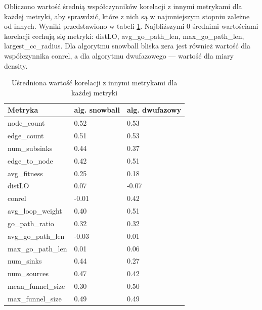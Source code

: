 Obliczono wartość średnią współczynników korelacji z innymi metrykami dla każdej metryki, aby sprawdzić, które z nich
są w najmniejszym stopniu zależne od innych. Wyniki przedstawiono w tabeli \ref{tab:meancorr}.
Najbliższymi 0 średnimi wartościami korelacji cechują się metryki: distLO, avg\_go\_path\_len, max\_go\_path\_len, largest\_cc\_radius.
Dla algorytmu snowball bliska zera jest również wartość dla współczynnika conrel, a dla algorytmu dwufazowego --- wartość dla miary density.

\begin{table}[]
    \centering
    \caption{Uśredniona wartość korelacji z innymi metrykami dla każdej metryki}
    \label{tab:meancorr}
    \begin{tabular}{|l|l|l|}
        \hline
        Metryka               & alg. snowball & alg. dwufazowy \\ \hline
        node\_count           & 0.52          & 0.53           \\ \hline
        edge\_count           & 0.51          & 0.53           \\ \hline
        num\_subsinks         & 0.44          & 0.37           \\ \hline
        edge\_to\_node        & 0.42          & 0.51           \\ \hline
        avg\_fitness          & 0.25          & 0.18           \\ \hline
        distLO                & 0.07          & -0.07          \\ \hline
        conrel                & -0.01         & 0.42           \\ \hline
        avg\_loop\_weight     & 0.40          & 0.51           \\ \hline
        go\_path\_ratio       & 0.32          & 0.32           \\ \hline
        avg\_go\_path\_len    & -0.03         & 0.01           \\ \hline
        max\_go\_path\_len    & 0.01          & 0.06           \\ \hline
        num\_sinks            & 0.44          & 0.27           \\ \hline
        num\_sources          & 0.47          & 0.42           \\ \hline
        mean\_funnel\_size    & 0.30          & 0.50           \\ \hline
        max\_funnel\_size     & 0.49          & 0.49           \\ \hline

\end{tabular}
\end{table}

